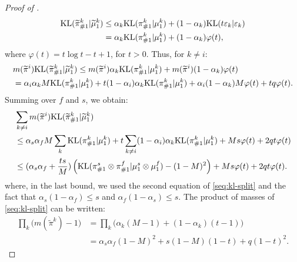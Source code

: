 \begin{proof}[Proof of ]
\begin{equation}
\begin{split}
      \text{KL}(\widetilde{\pi}^k_{\#1} \vert \widetilde{\mu}^k_1) &\leq
      \alpha_k \text{KL}(\pi^k_{\#1} \vert \mu^k_1) + (1 - \alpha_k) \text{KL}(t \varepsilon_k \vert \varepsilon_k) \\
      &= \alpha_k \text{KL}(\pi^k_{\#1} \vert \mu^k_1) + (1 - \alpha_k) \varphi(t),
    \end{split}
  \end{equation}
  where $\varphi(t) = t \log t - t + 1$, for $t > 0$. Thus, for $k\neq i$:
  \begin{equation}
    \begin{split}
      &m(\widetilde{\pi}^i) \text{KL}(\widetilde{\pi}^k_{\#1} \vert \widetilde{\mu}^k_1)
      \leq m(\widetilde{\pi}^i) \alpha_k \text{KL}(\pi^k_{\#1} \vert \mu^k_1)
      + m(\widetilde{\pi}^i) (1 - \alpha_k) \varphi(t) \\
      &= \alpha_i\alpha_k M \text{KL}(\pi^k_{\#1} \vert \mu^k_1)
      + t (1-\alpha_i) \alpha_k \text{KL}(\pi^k_{\#1} \vert \mu^k_1)
      + \alpha_i(1-\alpha_k) M \varphi(t) + t q\varphi(t).
    \end{split}
  \end{equation}
  Summing over $f$ and $s$, we obtain:
  \begin{equation}
    \begin{split}
      &\sum_{k \neq i} m(\widetilde{\pi}^i) \text{KL}(\widetilde{\pi}^k_{\#1} \vert \widetilde{\mu}^k_1) \\
      &\leq \alpha_s\alpha_f M \sum_k \text{KL}(\pi^k_{\#1} \vert \mu^k_1) +
      t \sum_{k \neq i} (1-\alpha_i) \alpha_k \text{KL}(\pi^k_{\#1} \vert \mu^k_1)
      + M s \varphi(t)+ 2q t \varphi(t) \\
      &\leq (\alpha_s\alpha_f + \frac{t s}{M})\left(\text{KL}(\pi^s_{\#1} \otimes \pi^f_{\#1}
      \vert \mu^s_1 \otimes \mu^f_1) - (1-M)^2\right) + M s \varphi(t)+ 2q t \varphi(t).
      \end{split}
  \end{equation}
    where, in the last bound, we used the second equation of \eqref{seq:kl-split}
    and the fact that $\alpha_s(1-\alpha_f) \leq s$ and  $\alpha_f(1-\alpha_s) \leq s$.
    The product of masses of \eqref{seq:kl-split} can be written:
  \begin{equation}
    \begin{split}
      \prod_{k} \big( m(\widetilde{\pi}^k) - 1 \big) &= \prod_k \big( \alpha_k(M-1)
      + (1-\alpha_k)(t-1) \big) \\
      &= \alpha_s\alpha_f(1-M)^2 + s(1-M)(1-t) + q(1-t)^2.
    \end{split}
  \end{equation}

\end{proof}
